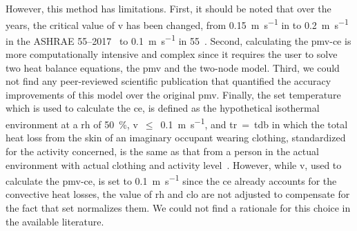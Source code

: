 However, this method has limitations.
First, it should be noted that over the years, the critical value of \ac{v} has been changed, from \qty{0.15}{\m\per\s} in  to \qty{0.2}{\m\per\s} in the ASHRAE 55--2017~\cite{ASHRAE552017, arens_moving_2009} to \qty{0.1}{\m\per\s} in \gls{55}~\cite{ashrae552023}.
Second, calculating the \ac{pmv-ce} is more computationally intensive and complex since it requires the user to solve two heat balance equations, the \ac{pmv} and the two-node model.
Third, we could not find any peer-reviewed scientific publication that quantified the accuracy improvements of this model over the original \ac{pmv}.
Finally, the \ac{set} temperature which is used to calculate the \ac{ce}, is defined as the hypothetical isothermal environment at a \ac{rh} of \qty{50}{\percent}, \ac{v}~$\leq$~\qty{0.1}{\m\per\s}, and \ac{tr}~=~\ac{tdb} in which the total heat loss from the skin of an imaginary occupant wearing clothing, standardized for the activity concerned, is the same as that from a person in the actual environment with actual clothing and activity level~\cite{ashrae552023}.
However, while \ac{v}, used to calculate the \ac{pmv-ce}, is set to \qty{0.1}{\m\per\s} since the \ac{ce} already accounts for the convective heat losses, the value of \ac{rh} and \ac{clo} are not adjusted to compensate for the fact that \ac{set} normalizes them.
We could not find a rationale for this choice in the available literature.

